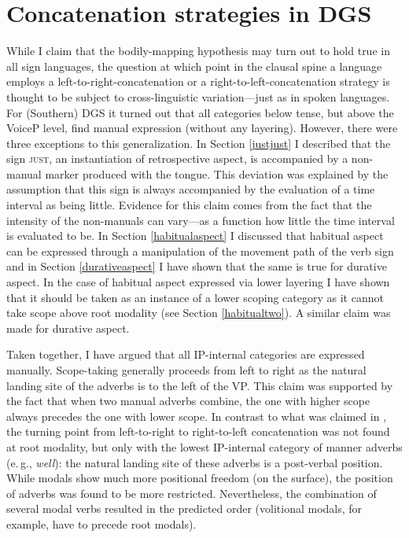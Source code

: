 

\section{Concatenation strategies in DGS}\label{concatenatiostrategies}
While I claim that the bodily-mapping hypothesis may turn out to hold true in all sign languages, the question at which point in the clausal spine a language employs a left-to-right-concatenation or a right-to-left-concatenation strategy is thought to be subject to cross-linguistic variation---just as in spoken languages. For (Southern) DGS it turned out that all categories below tense, but above the VoiceP level, find manual expression (without any layering). However, there were three exceptions to this generalization. In Section \ref{justjust} I described that the sign \textsc{just}, an instantiation of retrospective aspect, is accompanied by a non-manual marker produced with the tongue. This deviation was explained by the assumption that this sign is always accompanied by the evaluation of a time interval as being little. Evidence for this claim comes from the fact that the intensity of the non-manuals can vary---as a function how little the time interval is evaluated to be. In Section \ref{habitualaspect} I discussed that habitual aspect can be expressed through a manipulation of the movement path of the verb sign and in Section \ref{durativeaspect} I have shown that the same is true for durative aspect. In the case of habitual aspect expressed via lower layering I have shown that it should be taken as an instance of a lower scoping category as it cannot take scope above root modality (see Section \ref{habitualtwo}). A similar claim was made for durative aspect.

Taken together, I have argued that all IP-internal categories are expressed manually. Scope-taking generally proceeds from left to right as the natural landing site of the adverbs is to the left of the VP. This claim was supported by the fact that when two manual adverbs combine, the one with higher scope always precedes the one with lower scope. In contrast to what was claimed in \citet{bross2017scope}, the turning point from left-to-right to right-to-left concatenation was not found at root modality, but only with the lowest IP-internal category of manner adverbs (e.\,g., \textit{well}): the natural landing site of these adverbs is a post-verbal position. While modals show much more positional freedom (on the surface), the position of adverbs was found to be more restricted. Nevertheless, the combination of several modal verbs resulted in the predicted order (volitional modals, for example, have to precede root modals). 

